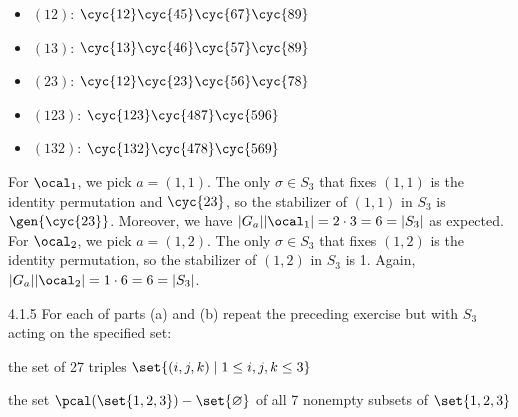 \begin{sol}
\begin{itemize}
        \item $(1 2)$: $\cyc{1 2}\cyc{4 5}\cyc{6 7}\cyc{8 9}$
        \item $(1 3)$: $\cyc{1 3}\cyc{4 6}\cyc{5 7}\cyc{8 9}$
        \item $(2 3)$: $\cyc{1 2}\cyc{2 3}\cyc{5 6}\cyc{7 8}$
        \item $(1 2 3)$: $\cyc{1 2 3}\cyc{4 8 7}\cyc{5 9 6}$
        \item $(1 3 2)$: $\cyc{1 3 2}\cyc{4 7 8}\cyc{5 6 9}$
    \end{itemize}
	For $\ocal_1$, we pick $a = (1, 1)$.
	The only $\sigma \in S_3$ that fixes $(1, 1)$ is the identity permutation and $\cyc{2 3}$, so the stabilizer of $(1, 1)$ in $S_3$ is $\gen{\cyc{2 3}}$.
	Moreover, we have $|G_a||\ocal_1| = 2 \cdot 3 = 6 = |S_3|$ as expected.
	For $\ocal_2$, we pick $a = (1, 2)$.
	The only $\sigma \in S_3$ that fixes $(1, 2)$ is the identity permutation, so the stabilizer of $(1, 2)$ in $S_3$ is 1.
	Again, $|G_a||\ocal_2| = 1 \cdot 6 = 6 = |S_3|$.
\end{sol}

\begin{exercise}{4.1.5}
	For each of parts (a) and (b) repeat the preceding exercise but with $S_3$ acting on the specified set:
	\begin{subexercises}
		\item the set of 27 triples \(\set{(i,j,k) \mid 1 \le i,j,k \le 3}\)
		\item the set \(\pcal(\set{1,2,3}) - \set{\varnothing}\) of all 7 nonempty subsets of \(\set{1,2,3}\)
	\end{subexercises}
\end{exercise}

